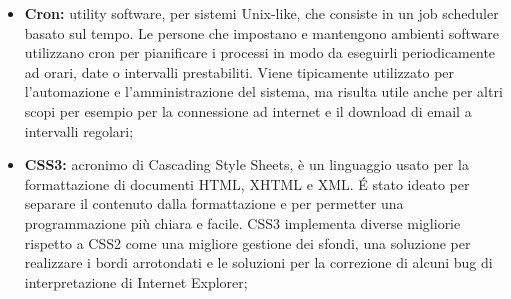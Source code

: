 \begin{itemize}
		\item \textbf{Cron:} utility software, per sistemi Unix-like, che consiste in un job scheduler basato sul tempo. Le persone che impostano e mantengono ambienti software utilizzano cron per pianificare i processi in modo da eseguirli periodicamente ad orari, date o intervalli prestabiliti. Viene tipicamente utilizzato per l'automazione e l'amministrazione del sistema, ma risulta utile anche per altri scopi per esempio per la connessione ad internet e il download di email a intervalli regolari;
		\item \textbf{CSS3:} acronimo di Cascading Style Sheets, è un linguaggio usato per la formattazione di documenti HTML, XHTML e XML. É stato ideato per separare il contenuto dalla formattazione e per permetter una programmazione più chiara e facile. CSS3 implementa diverse migliorie rispetto a CSS2 come una migliore gestione dei sfondi, una soluzione per realizzare i bordi arrotondati e le soluzioni per la correzione di alcuni bug di interpretazione di Internet Explorer;
	\end{itemize}
\pagebreak

